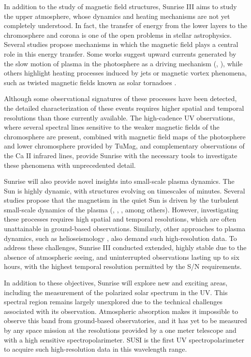In addition to the study of magnetic field structures, Sunrise III aims to study the upper atmosphere, whose dynamics and heating mechanisms are not yet completely understood. In fact, the transfer of energy from the lower layers to the chromosphere and corona is one of the open problems in stellar astrophysics. Several studies propose mechanisms in which the magnetic field plays a central role in this energy transfer. Some works suggest upward currents generated by the slow motion of plasma in the photosphere as a driving mechanism (\citealt{upwards1}, \citealt{upwards2}), while others highlight heating processes induced by jets \citep{jetscorona} or magnetic vortex phenomena, such as twisted magnetic fields known as solar tornadoes \citep{solar_tornadoes}.

Although some observational signatures of these processes have been detected, the detailed characterization of these events requires higher spatial and temporal resolutions than those currently available. The high-cadence UV observations, where several spectral lines sensitive to the weaker magnetic fields of the chromosphere are present, combined with magnetic field maps of the photosphere and lower chromosphere provided by TuMag, and complementary observations of the Ca II infrared lines, provide Sunrise with the necessary tools to investigate these phenomena with unprecedented detail.

Sunrise will also provide novel insights into small-scale plasma dynamics. The Sun is highly dynamic, with structures evolving on timescales of minutes. Several studies propose that the magnetism in the quiet Sun is driven by the turbulent small-scale dynamics of the plasma (\cite{small_scale_dynamo}, \cite{small_scale_dynamo_2}, \cite{small_scale_dynamo_3}, among others). However, investigating these processes requires high spatial and temporal resolutions, which are often unattainable in ground-based observations. Similarly, other approaches to plasma dynamics, such as helioseismology \citep{helioseismology}, also demand such high-resolution data. To address these challenges, Sunrise III conducted extended, highly stable due to the absence of atmospheric seeing, and uninterrupted observations lasting up to six hours, with the highest temporal resolution permitted by the S/N requirements.

In addition to these objectives, Sunrise will explore new and exciting areas, including the measurement of the polarized solar spectrum in the UV. This spectral region remains largely unexplored due to the technical challenges associated with its observation. Atmospheric absorption makes it impossible to observe this band from ground-based observatories, and it has yet to be measured by any space mission at the resolutions provided by a one meter telescope and with a high sensitive spectropolarimeter. SUSI is the first UV spectropolarimeter to acquire such high-resolution data in this wavelength range.

